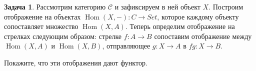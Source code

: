 \documentclass[10pt]{article}
\theoremstyle{definition}
\newtheorem{Pm}{Задача}[subsection]
\DeclareMathOperator{\dom}{dom}
\DeclareMathOperator{\cod}{cod}
\DeclareMathOperator{\Hom}{Hom}
\begin{document}
\begin{Pm}
    Рассмотрим категорию $\mathcal{C}$ и зафиксируем в ней объект $X$. 
    Построим отображение на объектах $\Hom(X,-): C \to Set$, которое каждому объекту сопоставляет множество $\Hom(X, A)$. 
    Теперь определим отображение на стрелках следующим образом: стрелке $f : A \to B$ сопоставим отображение между $\Hom(X,A)$ и $\Hom(X,B)$, отправляющее $g: X\to A$ в $fg : X \to B$. 

    Покажите, что эти отображения дают функтор. 
\end{Pm}
\end{document}
